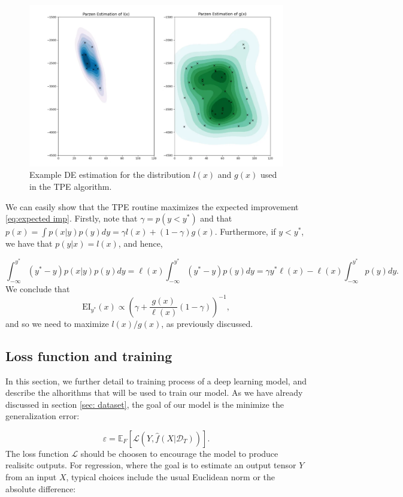\begin{figure}
    \centering
    \includegraphics[width=0.6\linewidth]{img/ML/Parzen.pdf}
    \caption{Example DE estimation for the distribution $l(x)$ and $g(x)$ used in the TPE algorithm.}
    \label{fig:ML TPE}
\end{figure}

We can easily show that the TPE routine maximizes the expected improvement \cref{eq:expected imp}.
Firstly, note that $\gamma=p(y<y^*)$ and that $p(x)=\int p(x|y)p(y)dy=\gamma l(x) +(1-\gamma) g(x)$. Furthermore, if $y<y^*$, we have that 
$p(y|x)=l(x)$, and hence,

\begin{equation}
    \int_{-\infty}^{y^*}(y^*-y)p(x|y)p(y)dy=\ell(x)\int_{-\infty}^{y^*}(y^*-y)p(y)dy=\gamma y^*\ell(x)-\ell(x)\int_{-\infty}^{y^*}p(y)dy.
\end{equation}
We conclude that 
\begin{equation}
    \text{EI}_{y^*}(x)\propto \left(\gamma+\frac{g(x)}{\ell(x)}(1-\gamma)\right)^{-1},
\end{equation}
and so we need to maximize $l(x)/g(x)$, as previously discussed.




\subsection{Loss function and training}
In this section, we further detail to training process of a deep learning model, and describe the alhorithms that will be used to train our model.
As we have already discussed in section \ref{sec: dataset}, the goal of our model is the minimize the generalization error:

\begin{equation}
    \varepsilon =\mathbb{E}_F[\mathcal{L}(Y,\hat{f}(X|\mathcal{D}_T))].
\end{equation}
The loss function $\mathcal{L}$ should be choosen to encourage the model to produce realisitc outputs. For regression, where the goal is to estimate an output tensor $Y$ from an input $X$, typical choices include the usual Euclidean norm or the absolute difference:

